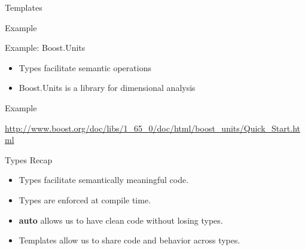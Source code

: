 \documentclass{beamer}
\begin{document}
		
		\begin{frame}{Templates}
			\begin{exampleblock}{Example}
				\lstI
			\end{exampleblock}
		\end{frame}
	
	
	\begin{frame}{Example: Boost.Units}
		\begin{itemize}
			\item Types facilitate semantic operations
			\item Boost.Units is a library for dimensional analysis
		\end{itemize}
		
		\begin{exampleblock}{Example}
		\lstI
		\end{exampleblock}
		
		\bigskip
		\bigskip
		
		\begin{center}
			\tiny{\url{http://www.boost.org/doc/libs/1_65_0/doc/html/boost_units/Quick_Start.html}}
		\end{center}
	\end{frame}
	
	\begin{frame}{Types Recap}
		\begin{itemize}
			\item Types facilitate semantically meaningful code.
			\medskip
			\item Types are enforced at compile time.
			\medskip
			\item \textbf{auto} allows us to have clean code without losing types.
			\medskip
			\item Templates allow us to share code and behavior across types.
		\end{itemize}
	\end{frame}
	
\end{document}
